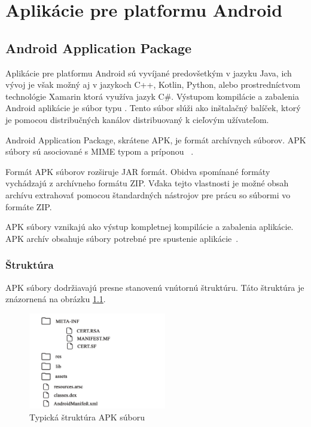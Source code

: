 \chapter{Aplikácie pre platformu Android}
\section{Android Application Package}
Aplikácie pre platformu Android sú vyvíjané predovšetkým v jazyku Java, ich vývoj je však možný aj v jazykoch C++, Kotlin, Python, alebo prostredníctvom technológie Xamarin ktorá využíva jazyk C\#. Výstupom kompilácie a zabalenia Android aplikácie je súbor typu . Tento súbor slúži ako inštalačný balíček, ktorý je pomocou distribučných kanálov distribuovaný k cieľovým užívateľom.

Android Application Package, skrátene APK, je formát archívnych súborov. APK súbory sú asociované s MIME typom  a príponou ~\cite{IANA}. 

Formát APK súborov rozširuje JAR formát. Obidva spomínané formáty vychádzajú z archívneho formátu ZIP. Vďaka tejto vlastnosti je možné obsah archívu extrahovať pomocou štandardných nástrojov pre prácu so súbormi vo formáte ZIP.

APK súbory vznikajú ako výstup kompletnej kompilácie a zabalenia aplikácie. APK archív obsahuje súbory potrebné pre spustenie aplikácie~\cite{Allen2015}.

\subsection{Štruktúra}
\label{sec:struktura}
APK súbory dodržiavajú presne stanovenú vnútornú štruktúru. Táto štruktúra je znázornená na obrázku \ref{fig:strukturaApk}.

\begin{figure}[htb]
  \begin{center}
    \includegraphics[width=60mm]{images/apkStructure.pdf}
  \end{center}
  \caption{Typická štruktúra APK súboru}
  \label{fig:strukturaApk}
\end{figure}


